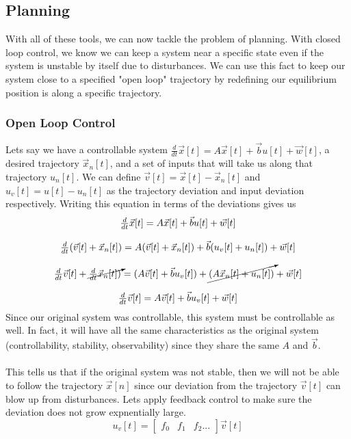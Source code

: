 \documentclass{article}
\begin{document}
\subsection{Planning}
With all of these tools, we can now tackle the problem of planning. With closed loop control, we know we can keep a system near a specific state even if the system is unstable by itself due to disturbances.
We can use this fact to keep our system close to a specified "open loop" trajectory by redefining our equilibrium position is along a specific trajectory.
\subsubsection{Open Loop Control}
Lets say we have a controllable system $\frac{d}{dt} \vec{x}[t]=A\vec{x}[t]+\vec{b}u[t] + \vec{w}[t]$, a desired trajectory $\vec{x}_n[t]$, and a set of inputs that will take us along that trajectory $u_n[t]$.
We can define $\vec{v}[t] = \vec{x}[t]-\vec{x}_n[t]$ and $u_v[t] = u[t] - u_n[t]$ as the trajectory deviation and input deviation respectively.
Writing this equation in terms of the deviations gives us
\[
    \begin{array}{c}
        \frac{d}{dt}\vec{x}[t]=A\vec{x}[t]+\vec{b}u[t]+ \vec{w}[t]\\\\
        \frac{d}{dt}(\vec{v}[t]+\vec{x}_n[t]) = A(\vec{v}[t] + \vec{x}_n[t]) + \vec{b}(u_v[t] + u_n[t])+ \vec{w}[t]\\\\
        \frac{d}{dt}\vec{v}[t] + \cancelto{}{\frac{d}{dt}\vec{x}_n[t])} = (A\vec{v}[t] + \vec{b}u_v[t]) + \cancelto{}{(A\vec{x}_n[t] + u_n[t])} + \vec{w}[t]\\\\
        \frac{d}{dt}\vec{v}[t] = A\vec{v}[t]+\vec{b}u_v[t] + \vec{w}[t]
    \end{array}
\]
Since our original system was controllable, this system must be controllable as well. In fact, it will have all the same characteristics as the original system (controllability, stability, observability) since they share the same $A$ and $\vec{b}$.
\\\\This tells us that if the original system was not stable, then we will not be able to follow the trajectory $\vec{x}[n]$ since our deviation from the trajectory $\vec{v}[t]$ can blow up from disturbances.
Lets apply feedback control to make sure the deviation does not grow expnentially large.
\[
    u_v[t] = 
    \left[
        \begin{array}{cccc}
            f_0 & f_1 & f_2 ...
        \end{array}
    \right] \vec{v}[t]
\]
\end{document}
